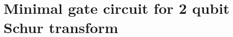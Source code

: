 \documentclass[landscape, 12pt]{article}
\begin{document}

\section{Minimal gate circuit for 2 qubit Schur transform}
\end{document}
